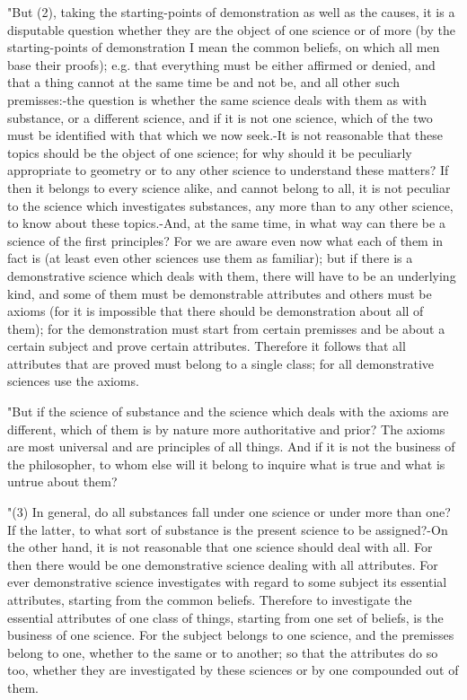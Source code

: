 "But (2), taking the starting-points of demonstration as well as the
causes, it is a disputable question whether they are the object of
one science or of more (by the starting-points of demonstration I
mean the common beliefs, on which all men base their proofs); e.g.
that everything must be either affirmed or denied, and that a thing
cannot at the same time be and not be, and all other such premisses:-the
question is whether the same science deals with them as with substance,
or a different science, and if it is not one science, which of the
two must be identified with that which we now seek.-It is not reasonable
that these topics should be the object of one science; for why should
it be peculiarly appropriate to geometry or to any other science to
understand these matters? If then it belongs to every science alike,
and cannot belong to all, it is not peculiar to the science which
investigates substances, any more than to any other science, to know
about these topics.-And, at the same time, in what way can there be
a science of the first principles? For we are aware even now what
each of them in fact is (at least even other sciences use them as
familiar); but if there is a demonstrative science which deals with
them, there will have to be an underlying kind, and some of them must
be demonstrable attributes and others must be axioms (for it is impossible
that there should be demonstration about all of them); for the demonstration
must start from certain premisses and be about a certain subject and
prove certain attributes. Therefore it follows that all attributes
that are proved must belong to a single class; for all demonstrative
sciences use the axioms. 

"But if the science of substance and the science which deals with
the axioms are different, which of them is by nature more authoritative
and prior? The axioms are most universal and are principles of all
things. And if it is not the business of the philosopher, to whom
else will it belong to inquire what is true and what is untrue about
them? 

"(3) In general, do all substances fall under one science or under
more than one? If the latter, to what sort of substance is the present
science to be assigned?-On the other hand, it is not reasonable that
one science should deal with all. For then there would be one demonstrative
science dealing with all attributes. For ever demonstrative science
investigates with regard to some subject its essential attributes,
starting from the common beliefs. Therefore to investigate the essential
attributes of one class of things, starting from one set of beliefs,
is the business of one science. For the subject belongs to one science,
and the premisses belong to one, whether to the same or to another;
so that the attributes do so too, whether they are investigated by
these sciences or by one compounded out of them. 

